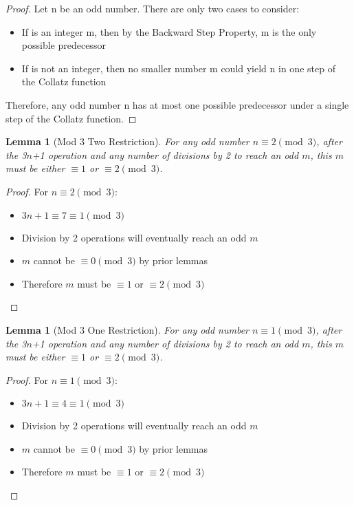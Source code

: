 \documentclass[11pt]{article}
\newtheorem{lemma}[theorem]{Lemma}
\begin{document}
\begin{proof}
Let n be an odd number. There are only two cases to consider:
\begin{itemize}
    \item If  is an integer m, then by the Backward Step Property, m is the only possible predecessor
    \item If  is not an integer, then no smaller number m could yield n in one step of the Collatz function
\end{itemize}
Therefore, any odd number n has at most one possible predecessor under a single step of the Collatz function.
\end{proof}

\begin{lemma}[Mod 3 Two Restriction]
For any odd number \(n \equiv 2 \pmod{3}\), after the 3\(n\)+1 operation and any number of divisions by 2 to reach an odd \(m\), this \(m\) must be either \(\equiv 1\) or \(\equiv 2 \pmod{3}\).
\end{lemma}

\begin{proof}
For \(n \equiv 2 \pmod{3}\):
\begin{itemize}
    \item \(3n + 1 \equiv 7 \equiv 1 \pmod{3}\)
    \item Division by 2 operations will eventually reach an odd \(m\)
    \item \(m\) cannot be \(\equiv 0 \pmod{3}\) by prior lemmas
    \item Therefore \(m\) must be \(\equiv 1\) or \(\equiv 2 \pmod{3}\)
\end{itemize}
\end{proof}

\begin{lemma}[Mod 3 One Restriction]
For any odd number \(n \equiv 1 \pmod{3}\), after the 3\(n\)+1 operation and any number of divisions by 2 to reach an odd \(m\), this \(m\) must be either \(\equiv 1\) or \(\equiv 2 \pmod{3}\).
\end{lemma}

\begin{proof}
For \(n \equiv 1 \pmod{3}\):
\begin{itemize}
    \item \(3n + 1 \equiv 4 \equiv 1 \pmod{3}\)
    \item Division by 2 operations will eventually reach an odd \(m\)
    \item \(m\) cannot be \(\equiv 0 \pmod{3}\) by prior lemmas
    \item Therefore \(m\) must be \(\equiv 1\) or \(\equiv 2 \pmod{3}\)
\end{itemize}
\end{proof}
\end{document}
